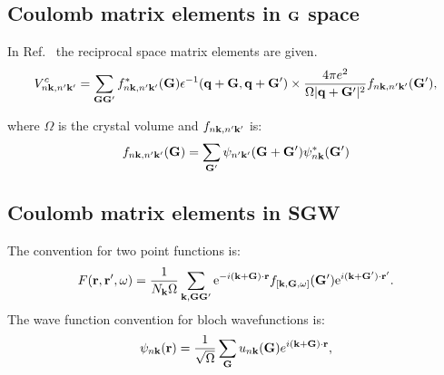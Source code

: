 \subsection{Coulomb matrix elements in ${\bf G}$ space}
In Ref.~\cite{cohen95} the reciprocal space matrix elements are given.
%
\begin{equation}
\label{eq:cohen1}
V^{c}_{n{\bf k},n'{\bf k}'} = \sum_{{\bf G}{\bf G}'}f^{*}_{n{\bf k},n'{\bf k}'}({\bf G})\epsilon^{-1}({\bf q}+{\bf G},{\bf q}+{\bf G}')
\times \frac{4\pi e^{2}}{\Omega|{\bf q}+{\bf G}'|^{2}}f_{n{\bf k},n'{\bf k}'}({\bf G}'),
\end{equation}

where $\Omega$ is the crystal volume and $f_{n{\bf k},n'{\bf k}'}$ is:
%
\begin{equation}
\label{eq:cohen2}
f_{n{\bf k},n'{\bf k}'}({\bf G}) = \sum_{{\bf G}'} \psi_{n'{\bf k}'}({\bf G}+{\bf G}')\psi^{*}_{n{\bf k}}({\bf G}')
\end{equation}
%

\subsection{Coulomb matrix elements in SGW}
The convention for two point functions is:
%
\begin{equation}\label{eq.fourier}
 F({\bf r},{\bf r}',\omega) = \frac{1}{N_{\bf k}\Omega}  \sum_{{\bf k},{\bf G}{\bf G}'} 
  {\rm e}^{-i({\bf k}+{\bf G})\cdot{\bf r}} 
  f_{[{\bf k},{\bf G},\omega]}({\bf G}')
  {\rm e}^{i({\bf k}+{\bf G}')\cdot{\bf r}'}.
\end{equation}
%
The wave function convention for bloch wavefunctions is:
%
\begin{equation}
\psi_{n{\bf k}}({\bf r}) = \frac{1}{\sqrt{\Omega}}\sum_{{\bf G}}u_{n{\bf k}}({\bf G})e^{i({\bf k}+{\bf G})\cdot{\bf r}},
\end{equation}

